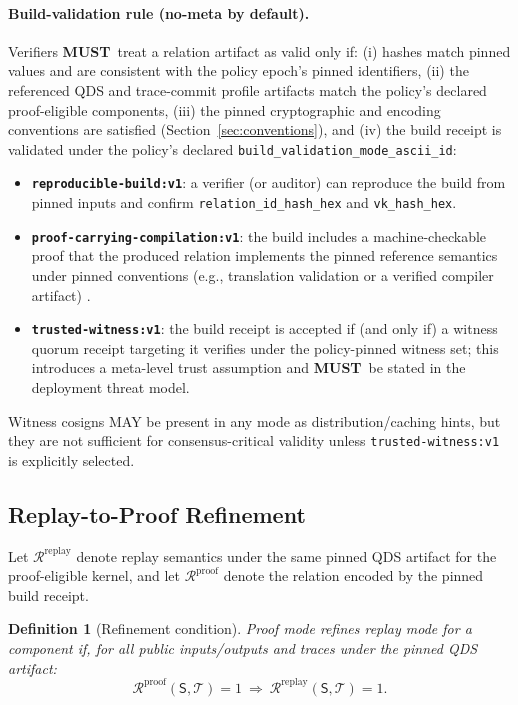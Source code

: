 \documentclass[11pt]{article}
\newcommand{\MUST}{\textbf{MUST}}
\newcommand{\Rel}{\mathcal{R}}
\newcommand{\Trace}{\mathcal{T}}
\newcommand{\Stmt}{\mathsf{S}}
\newtheorem{definition}{Definition}
\begin{document}
\paragraph{Build-validation rule (no-meta by default).}
Verifiers \MUST\ treat a relation artifact as valid only if:
(i) hashes match pinned values and are consistent with the policy epoch's pinned identifiers,
(ii) the referenced QDS and trace-commit profile artifacts match the policy's declared proof-eligible components,
(iii) the pinned cryptographic and encoding conventions are satisfied (Section~\ref{sec:conventions}),
and
(iv) the build receipt is validated under the policy's declared \texttt{build\_validation\_mode\_ascii\_id}:
\begin{itemize}[leftmargin=1.2em]
  \item \textbf{\texttt{reproducible-build:v1}}: a verifier (or auditor) can reproduce the build from pinned inputs and confirm \texttt{relation\_id\_hash\_hex} and \texttt{vk\_hash\_hex}.
  \item \textbf{\texttt{proof-carrying-compilation:v1}}: the build includes a machine-checkable proof that the produced relation implements the pinned reference semantics under pinned conventions (e.g., translation validation or a verified compiler artifact) \cite{Necula2000TV,Leroy2009CompCert}.
  \item \textbf{\texttt{trusted-witness:v1}}: the build receipt is accepted if (and only if) a witness quorum receipt targeting it verifies under the policy-pinned witness set; this introduces a meta-level trust assumption and \MUST\ be stated in the deployment threat model.
\end{itemize}
Witness cosigns MAY be present in any mode as distribution/caching hints, but they are not sufficient for consensus-critical validity unless \texttt{trusted-witness:v1} is explicitly selected.

\subsection{Replay-to-Proof Refinement}

Let $\Rel^{\text{replay}}$ denote replay semantics under the same pinned QDS artifact for the proof-eligible kernel, and let $\Rel^{\text{proof}}$ denote the relation encoded by the pinned build receipt.

\begin{definition}[Refinement condition]
Proof mode refines replay mode for a component if, for all public inputs/outputs and traces under the pinned QDS artifact:
\[
\Rel^{\text{proof}}(\Stmt,\Trace)=1 \ \Rightarrow\ \Rel^{\text{replay}}(\Stmt,\Trace)=1.
\]
\end{definition}
\end{document}
